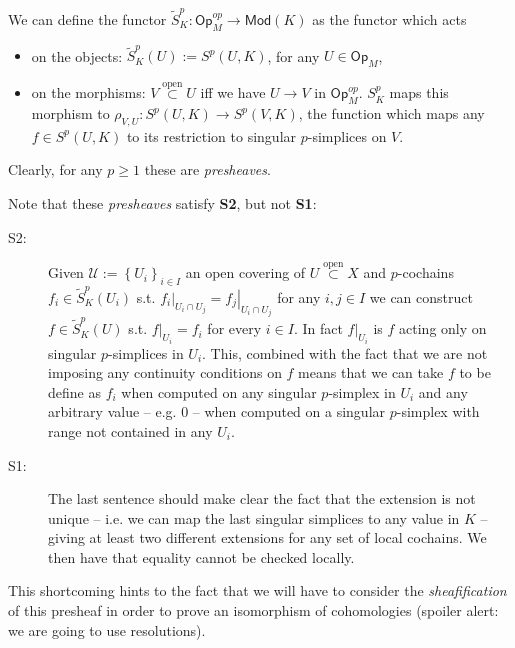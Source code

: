 \begin{defn}
	We can define the functor $\widetilde{S}^p_K: \mathsf{Op}_M^{op} \to \mathsf{Mod}\left( K \right)$ as the functor which acts
	\begin{itemize}
		\item on the objects: $\widetilde{S}^p_K(U) := S^p \left(U, K\right)$, for any $U \in \mathsf{Op}_M$,
		\item on the morphisms: $V \stackrel{\text{open}}{\subset}  U$ iff we have $U \xrightarrow{} V$ in $\mathsf{Op}_M^{op}$. $S^p_K$ maps this morphism to $\rho_{V,U}: S^p \left(U, K\right) \to S^p \left(V, K\right)$, the function which maps any $f \in S^p \left(U, K\right)$ to its restriction to singular $p$-simplices on $V$. 
	\end{itemize} 
	Clearly, for any $p \geq 1$ these are \textit{presheaves}.
\end{defn}

Note that these \textit{presheaves} satisfy \textbf{S2}, but not \textbf{S1}:
\begin{description}
	\item[S2:] Given $\mathcal{U} := \left\{ U_i \right\}_{i \in I}$ an open covering of $U \stackrel{\text{open}}{\subset} X$ and $p$-cochains $f_i \in \widetilde{S}_K^p(U_i)$ s.t. $\left.f_i\right|_{U_i \cap U_j} = \left.f_j\right|_{U_i \cap U_j}$ for any $i, j \in I$ we can construct $f \in \widetilde{S}^p_K(U)$ s.t. $\left.f\right|_{U_i} = f_i$ for every $i \in I$.
		In fact $\left.f\right|_{U_i}$ is $f$ acting only on singular $p$-simplices in $U_i$.
		This, combined with the fact that we are not imposing any continuity conditions on $f$ means that we can take $f$ to be define as $f_i$ when computed on any singular $p$-simplex in $U_i$ and any arbitrary value -- e.g. 0 -- when computed on a singular $p$-simplex with range not contained in any $U_i$.
	\item[S1:] The last sentence should make clear the fact that the extension is not unique -- i.e. we can map the last singular simplices to any value in $K$ -- giving at least two different extensions for any set of local cochains.
		We then have that equality cannot be checked locally.
\end{description} 

This shortcoming hints to the fact that we will have to consider the \textit{sheafification} of this presheaf in order to prove an isomorphism of cohomologies (spoiler alert: we are going to use resolutions).


